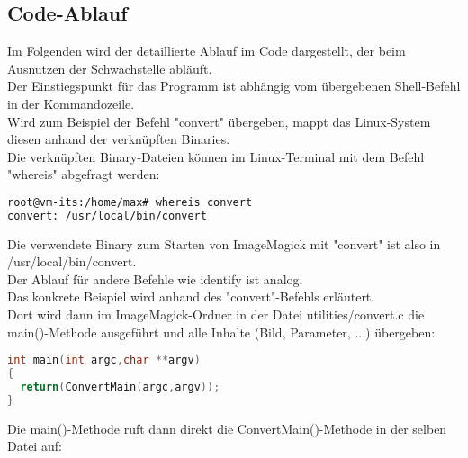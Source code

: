 \subsection{Code-Ablauf}\label{subsec:code-ablauf}

Im Folgenden wird der detaillierte Ablauf im Code dargestellt, der beim Ausnutzen der Schwachstelle abläuft.\\

Der Einstiegspunkt für das Programm ist abhängig vom übergebenen Shell-Befehl in der Kommandozeile.\\
Wird zum Beispiel der Befehl "convert" übergeben, mappt das Linux-System diesen anhand der verknüpften Binaries.\\

Die verknüpften Binary-Dateien können im Linux-Terminal mit dem Befehl "whereis" abgefragt werden:\\

\begin{lstlisting}[language=Bash, caption=whereis Binary Abfrage,label={lst:lstlisting}]
root@vm-its:/home/max# whereis convert
convert: /usr/local/bin/convert
\end{lstlisting}
\vspace{5mm}

Die verwendete Binary zum Starten von ImageMagick mit "convert" ist also in /usr/local/bin/convert.\\
Der Ablauf für andere Befehle wie identify ist analog.\\
Das konkrete Beispiel wird anhand des "convert"-Befehls erläutert.\\

Dort wird dann im ImageMagick-Ordner in der Datei utilities/convert.c die main()-Methode ausgeführt und alle Inhalte (Bild, Parameter, ...) übergeben:\\

\begin{lstlisting}[firstnumber=90, language=C, caption=utilities/convert.c Einstieg main(),label={lst:lstlisting}]
int main(int argc,char **argv)
{
  return(ConvertMain(argc,argv));
}
\end{lstlisting}
\vspace{5mm}

Die main()-Methode ruft dann direkt die ConvertMain()-Methode in der selben Datei auf:\\

